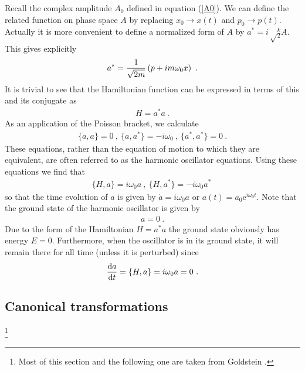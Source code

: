\documentclass[12pt]{article}
\begin{document}
Recall the complex amplitude $A_0$ defined in equation (\ref{A0}). We can define the related function on phase space $A$
by replacing $x_0\to x(t)$ and $p_0\to p(t)$. Actually it is more convenient to define a normalized form of $A$ by $a^*=i\sqrt\frac k2 A$. This gives explicitly
\begin{eqnarray}
a^*={1\over \sqrt{2m}} \left( p+i m \omega_0 x\right)~.
\end{eqnarray} 
It is trivial to see that the Hamiltonian function can be expressed in terms of this and its conjugate as
\begin{eqnarray}
H=  a^*   a~.
\end{eqnarray}
As an application of the Poisson bracket, we calculate
\begin{eqnarray}
\{  a,   a\}=0~,~\{  a,   a^*\}=-i\omega_0~,~\{  a^*,   a^*\}=0~.
\end{eqnarray}
These equations, rather than the equation of motion to which they are equivalent, are often referred to as the harmonic oscillator equations. 
Using these equations we find that 
\begin{eqnarray}
\{ H, a\}=i \omega_0 a~,~\{ H, a^*\}=-i \omega_0 a^*~
\end{eqnarray}
so that the time evolution of $a$ is given by $\dot a =i\omega_0 a$ or $a(t)=a_0 \mathrm e^{i\omega_0 t}$.
Note that the ground state of the harmonic oscillator is given by
\begin{eqnarray}
a=0~.
\end{eqnarray}
Due to the form of the Hamiltonian $H=a^*a$ the ground state obviously has energy $E=0$. Furthermore, when the oscillator is in its ground state, it will remain there for all time (unless it is perturbed) since
\begin{eqnarray}
{\mathrm d a\over \mathrm dt}=\{H, a\}=i\omega_0 a=0~.
\end{eqnarray}

\subsection{Canonical transformations}\footnote{Most of this section and the following one are taken from Goldstein \cite{Goldstein}.}
\end{document}
